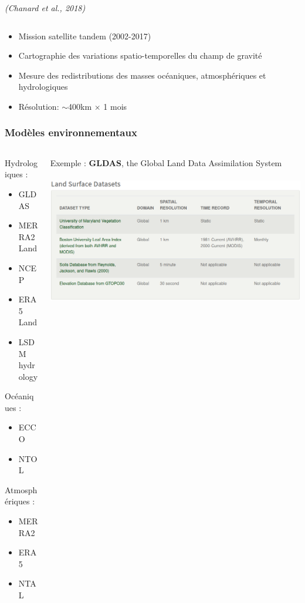 \documentclass[9pt]{beamer}
\begin{document}
\begin{frame}
\begin{columns}
\begin{column}{0.8\textwidth}
          \tiny{\textit{(Chanard et al., 2018)}}
        \end{column}
    \end{columns}
          \begin{itemize}
              \item Mission satellite tandem (2002-2017)
              \item Cartographie des variations spatio-temporelles du champ de gravité
              \item Mesure des redistributions des masses océaniques, atmosphériques et hydrologiques
              \item Résolution: $\sim$400km $\times$ 1 mois
          \end{itemize}
\end{frame}

\begin{frame}
\frametitle{Modèles environnementaux}
    \begin{columns}
        \begin{column}{0.2\textwidth}
            Hydrologiques :
            \begin{itemize}
                \item GLDAS
                \item MERRA2 Land
                \item NCEP
                \item ERA5 Land
                \item LSDM hydrology
            \end{itemize}
            Océaniques :
            \begin{itemize}
                \item ECCO
                \item NTOL
            \end{itemize}
            Atmosphériques :
            \begin{itemize}
                \item MERRA2
                \item ERA5
                \item NTAL
            \end{itemize}
        \end{column}
        \begin{column}{0.8\textwidth}
            Exemple : \textbf{GLDAS}, the Global Land Data Assimilation System\\ \\
            \includegraphics[width=\textwidth]{figures/obs_gldas.png}

\end{column}
\end{columns}
\end{frame}
\end{document}
